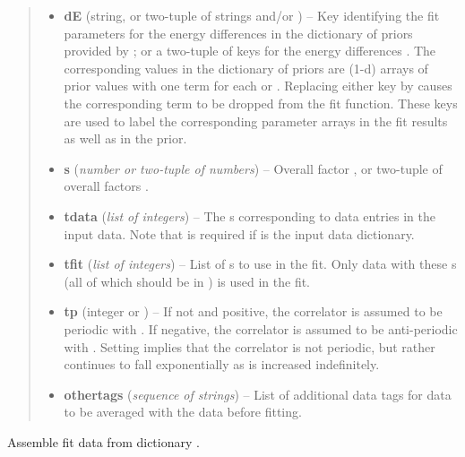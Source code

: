 \documentclass[letterpaper,10pt,english]{sphinxmanual}
\begin{document}
\begin{fulllineitems}
\begin{quote}
\begin{description}
\begin{itemize}
\item {} 
\textbf{dE} (string, or two-tuple of strings and/or ) -- Key identifying the fit parameters for the energy 
differences  in the dictionary of priors provided by
{\hyperref[corrfitter:corrfitter.CorrFitter]{}}; or a two-tuple of keys for the energy differences
. The corresponding values in the dictionary of priors
are (1-d) arrays of prior values with one term for each 
or . Replacing either key by  causes the
corresponding term to be dropped from the fit function. These keys
are used to label the corresponding parameter arrays in the fit
results as well as in the prior.

\item {} 
\textbf{s} (\emph{number or two-tuple of numbers}) -- Overall factor , or two-tuple of overall factors 
.

\item {} 
\textbf{tdata} (\emph{list of integers}) -- The s corresponding to data entries in the input
data. Note that  is
required if  is the input data dictionary.

\item {} 
\textbf{tfit} (\emph{list of integers}) -- List of s to use in the fit. Only data with these
s (all of which should be in ) is used in the fit.

\item {} 
\textbf{tp} (integer or ) -- If not  and positive, the correlator is assumed to 
be periodic with . If negative, the correlator
is assumed to be anti-periodic with . Setting
 implies that the correlator is not periodic, but rather
continues to fall exponentially as  is increased indefinitely.

\item {} 
\textbf{othertags} (\emph{sequence of strings}) -- List of additional data tags for data to be
averaged with the  data before fitting.

\end{itemize}

\end{description}\end{quote}

\begin{fulllineitems}
\label{corrfitter:corrfitter.Corr2.builddata}
Assemble fit data from dictionary .


\end{fulllineitems}
\end{fulllineitems}
\end{document}
